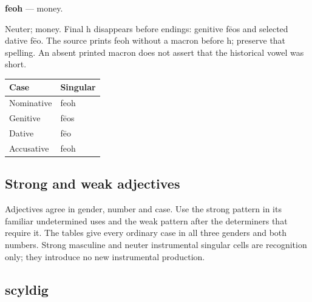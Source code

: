\par\begin{minipage}{\linewidth}\raggedright
\textbf{feoh} — money.

Neuter; money. Final h disappears before endings: genitive fēos and selected dative fēo. The source prints feoh without a macron before h; preserve that spelling. An absent printed macron does not assert that the historical vowel was short.

\par\begingroup
\fontsize{10.5}{13.2}\selectfont
\setlength{\LTleft}{0pt}\setlength{\LTright}{\fill}
\noindent
\begin{tabular}{@{}>{\raggedright\arraybackslash}p{60.59mm}>{\raggedright\arraybackslash}p{60.59mm}@{}}
\toprule
\textbf{Case} & \textbf{Singular} \\
\midrule
Nominative & feoh \\
Genitive & fēos \\
Dative & fēo \\
Accusative & feoh \\
\bottomrule
\end{tabular}
\par\endgroup

\end{minipage}\par
{}
\subsection*{Strong and weak adjectives}

Adjectives agree in gender, number and case. Use the strong pattern in its familiar undetermined uses and the weak pattern after the determiners that require it. The tables give every ordinary case in all three genders and both numbers. Strong masculine and neuter instrumental singular cells are recognition only; they introduce no new instrumental production.

\subsection*{scyldig}

